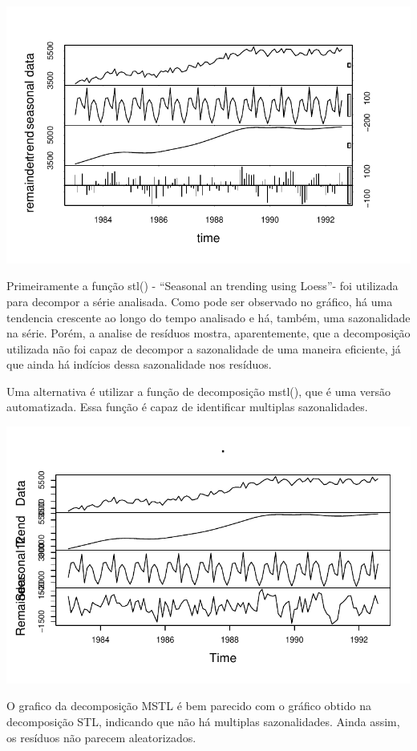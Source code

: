 \documentclass[
  letterpaper,
  DIV=11,
  numbers=noendperiod]{scrartcl}
\begin{document}
\includegraphics{Trabalhao1_ST_grupo5res_files/figure-pdf/unnamed-chunk-3-1.pdf}

Primeiramente a função stl() - ``Seasonal an trending using Loess''- foi
utilizada para decompor a série analisada. Como pode ser observado no
gráfico, há uma tendencia crescente ao longo do tempo analisado e há,
também, uma sazonalidade na série. Porém, a analise de resíduos mostra,
aparentemente, que a decomposição utilizada não foi capaz de decompor a
sazonalidade de uma maneira eficiente, já que ainda há indícios dessa
sazonalidade nos resíduos.

Uma alternativa é utilizar a função de decomposição mstl(), que é uma
versão automatizada. Essa função é capaz de identificar multiplas
sazonalidades.

\includegraphics{Trabalhao1_ST_grupo5res_files/figure-pdf/unnamed-chunk-4-1.pdf}

O grafico da decomposição MSTL é bem parecido com o gráfico obtido na
decomposição STL, indicando que não há multiplas sazonalidades. Ainda
assim, os resíduos não parecem aleatorizados.
\end{document}
